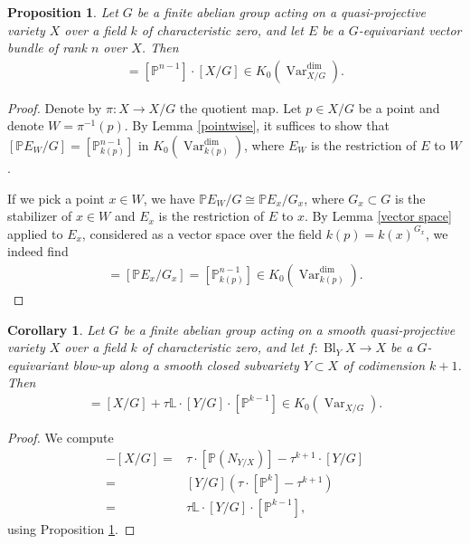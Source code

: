 \documentclass{amsart}
\newtheorem{cor}[thm]{Corollary}
\newtheorem{prop}[thm]{Proposition}
\theoremstyle{definition}
\DeclareMathOperator{\Var}{Var}
\DeclareMathOperator{\Bl}{Bl}
\numberwithin{equation}{section}
\begin{document}
\begin{prop}\label{514}
Let $G$ be a finite abelian group acting on a quasi-projective variety $X$ over a field $k$ of characteristic zero, and let $E$ be a $G$-equivariant vector bundle of rank $n$ over $X$. Then
\begin{align*}
    [\mathbb{P}(E)/G ] = [\mathbb{P}^{n-1}] \cdot [X/G] \in K_0(\Var_{X/G}^{\dim}).
\end{align*}
\end{prop}

\begin{proof}
Denote by $\pi: X \rightarrow X/G$ the quotient map. Let $p \in X/G$ be a point and denote $W = \pi^{-1}(p)$. By Lemma \ref{pointwise}, it suffices to show that $[\mathbb{P}E_W/G] = [\mathbb{P}_{k(p)}^{n-1}]$ in $K_0(\Var_{k(p)}^{\dim})$, where $E_W$ is the restriction of $E$ to $W$.

If we pick a point $x \in W$, we have $\mathbb{P}E_W/G \cong \mathbb{P}E_x / G_x$, where $G_x \subset G$ is the stabilizer of $x \in W$ and $E_x$ is the restriction of $E$ to $x$. By Lemma \ref{vector space} applied to $E_x$, considered as a vector space over the field $k(p) = k(x)^{G_x}$, we indeed find
\begin{align*}
    [\mathbb{P}E_W/G] = [\mathbb{P}E_x/G_x] = [\mathbb{P}_{k(p)}^{n-1}] \in K_0(\Var_{k(p)}^{\dim}).
\end{align*}
\end{proof}

\begin{cor}\label{G-equ weak}
Let $G$ be a finite abelian group acting on a smooth quasi-projective variety $X$ over a field $k$ of characteristic zero, and let $f:\Bl_Y X \rightarrow X$ be a $G$-equivariant blow-up along a smooth closed subvariety $Y \subset X$ of codimension $k+1$. Then
\begin{align*}
    [\Bl_Y X /G]= [X/G] + \tau \mathbb{L} \cdot  [Y/G ] \cdot [\mathbb{P}^{k-1}] \in K_0(\Var_{X/G}^{}).
\end{align*}
\end{cor}

\begin{proof}
We compute
\begin{align*}
    [\Bl_Y X/G] - [X/G] =& \tau \cdot [\mathbb{P}(N_{Y / X})] - \tau^{k+1} \cdot [Y/G] \\
    =& [Y/G] ( \tau \cdot [\mathbb{P}^{k}] - \tau^{k+1} ) \\
    =& \tau \mathbb{L} \cdot [Y/G] \cdot [\mathbb{P}^{k-1}],
\end{align*}
using Proposition \ref{514}.
\end{proof}
\end{document}
